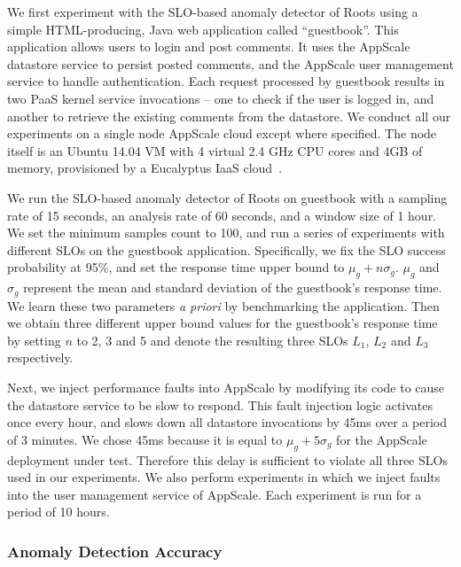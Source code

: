 We first experiment with the SLO-based anomaly detector of Roots
using a simple HTML-producing, Java 
web application called ``guestbook''.
This application allows users to login and post comments. It uses the
AppScale  datastore service to persist
posted comments, and the AppScale user management service to handle authentication. 
Each request processed
by guestbook results in two PaaS kernel service
invocations -- one to check if the user is logged in, and 
another to retrieve the existing comments from the datastore. We conduct all
our experiments on a single node AppScale cloud except where specified. The node itself is an Ubuntu
14.04 VM with 4 virtual 2.4 GHz CPU cores and 4GB of memory, provisioned by
a Eucalyptus IaaS cloud~\cite{eucalyptus09}.

We run the SLO-based anomaly detector of Roots on guestbook with a sampling rate of 15 seconds, an analysis
rate of 60 seconds, and a window size of 1 hour. We set the minimum samples count to 100, and
run a series of experiments with different SLOs on the guestbook application. Specifically, we fix
the SLO success probability at 95\%, and set the response time upper bound to $\mu_g + n\sigma_g$. 
$\mu_g$ and $\sigma_g$ represent the mean and standard deviation of the
guestbook's response time. We learn these two parameters \textit{a priori} by benchmarking
the application. Then we obtain three different upper bound values for the guestbook's
response time by setting 
$n$ to 2, 3 and 5 and denote the resulting three SLOs $L_1$, $L_2$ and $L_3$ respectively.

Next, we inject performance faults into AppScale by modifying its code
to cause the datastore service to be slow to respond.
This fault injection logic activates once every hour, and
slows down all datastore invocations by 45ms over a period of 3 minutes.
We chose 45ms because it is equal 
to $\mu_g + 5\sigma_g$ for the AppScale deployment under test. 
Therefore this delay is sufficient to violate all three SLOs used in our experiments. 
We also perform experiments in which we inject faults into the user management service of
AppScale. Each experiment is run for a period of 10 hours.

\subsubsection{Anomaly Detection Accuracy}

